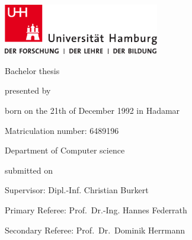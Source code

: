 \begin{titlepage}
    \includegraphics[width=6.8cm]{./pic/up-uhh-logo-u-2010-u-farbe-u-rgb.pdf}
    \begin{center}\Large
        \vfill
        Bachelor thesis
        \vfill

        \makeatletter
        {\Large\textsf{\textbf{\@title}}\par}
        \makeatother

        \vfill
        presented by
        \par\bigskip

        \makeatletter
        {\@author} \par
        \makeatother

        born on the 21th of December 1992 in Hadamar \par
        Matriculation number: 6489196 \par
        Department of Computer science
        \vfill

        \makeatletter
        submitted on {\@date}
        \makeatother

        \vfill
        Supervisor: Dipl.-Inf. Christian Burkert \par
        Primary Referee: Prof.\ Dr.-Ing. Hannes Federrath \par
        Secondary Referee: Prof.\ Dr.\ Dominik Herrmann

    \end{center}
\end{titlepage}
